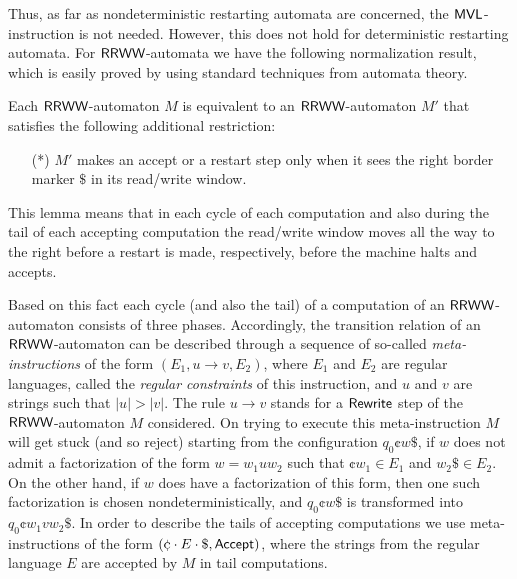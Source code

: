 Thus, as far as nondeterministic restarting automata are concerned, the \index{$\MVL$}$\MVL$-instruction is not needed. However, this does not hold for deterministic restarting automata. For $\textup{\sf RRWW}$-automata we have the following normalization result, which is easily proved by using standard techniques from automata theory.

\begin{lemma}
Each $\textup{\sf RRWW}$-automaton $M$ is equivalent to an $\textup{\sf RRWW}$-automaton $M'$ that satisfies the following additional restriction:
\begin{enumerate}
\item[(*)] $M'$ makes an accept or a restart step only when it sees the right border marker $\$$ in its read/write window.
\end{enumerate}
\end{lemma}

This lemma means that in each cycle of each computation and also during the tail of each accepting computation the read/write window moves all the way to the right before a restart is made, respectively, before the machine halts and accepts.

Based on this fact each cycle (and also the tail) of a computation of an $\textup{\sf RRWW}$-automaton consists of three phases. Accordingly, the transition relation of an $\textup{\sf RRWW}$-automaton can be described through a sequence of so-called \emph{meta-instructions} of the form $(E_1, u \to v, E_2)$, where $E_1$ and $E_2$ are regular languages, called the \emph{regular constraints} of this instruction, and $u$ and $v$ are strings such that $|u| > |v|$. The rule $u \to v$ stands for a \index{$\Rewrite$}$\Rewrite$ step of the $\textup{\sf RRWW}$-automaton $M$ considered. On trying to execute this meta-instruction $M$ will get stuck (and so reject) starting from the configuration $q_0 \cent w \$$, if $w$ does not admit a factorization of the form $w = w_1 u w_2$ such that $\cent w_1 \in E_1$ and $w_2 \$ \in E_2$. On the other hand, if $w$ does have a factorization of this form, then one such factorization is chosen nondeterministically, and $q_0 \cent w \$$ is transformed into $q_0 \cent w_1 v w_2 \$$. In order to describe the tails of accepting computations we use meta-instructions of the form \index{$\Accept$}$(\cent \cdot E \cdot \$, \Accept)$, where the strings from the regular language $E$ are accepted by $M$ in tail computations.


